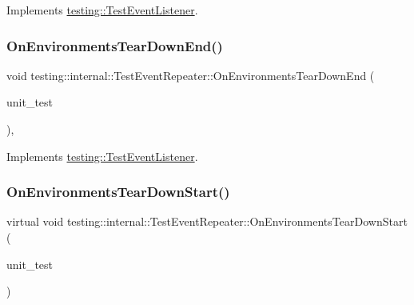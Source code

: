 Implements \mbox{\hyperlink{classtesting_1_1_test_event_listener_a9ea04fa7f447865ba76df35e12ba2092}{testing\+::\+Test\+Event\+Listener}}.

\mbox{\label{classtesting_1_1internal_1_1_test_event_repeater_a0bc5fc45653d32b5e1bcad059ee7616b}} 
\subsubsection{\texorpdfstring{OnEnvironmentsTearDownEnd()}{OnEnvironmentsTearDownEnd()}\hspace{0.1cm}{\footnotesize\ttfamily [3/3]}}
{\footnotesize\ttfamily void testing\+::internal\+::\+Test\+Event\+Repeater\+::\+On\+Environments\+Tear\+Down\+End (\begin{DoxyParamCaption}\item[{const \mbox{\hyperlink{classtesting_1_1_unit_test}{Unit\+Test}} \&}]{unit\+\_\+test }\end{DoxyParamCaption})\hspace{0.3cm}{\ttfamily [override]}, {\ttfamily [virtual]}}



Implements \mbox{\hyperlink{classtesting_1_1_test_event_listener_a9ea04fa7f447865ba76df35e12ba2092}{testing\+::\+Test\+Event\+Listener}}.

\mbox{\label{classtesting_1_1internal_1_1_test_event_repeater_a30db75df2d9a65d787f31e16004613c2}} 
\subsubsection{\texorpdfstring{OnEnvironmentsTearDownStart()}{OnEnvironmentsTearDownStart()}\hspace{0.1cm}{\footnotesize\ttfamily [1/3]}}
{\footnotesize\ttfamily virtual void testing\+::internal\+::\+Test\+Event\+Repeater\+::\+On\+Environments\+Tear\+Down\+Start (\begin{DoxyParamCaption}\item[{const \mbox{\hyperlink{classtesting_1_1_unit_test}{Unit\+Test}} \&}]{unit\+\_\+test }\end{DoxyParamCaption})\hspace{0.3cm}{\ttfamily [virtual]}}



